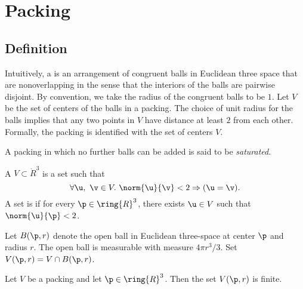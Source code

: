 
\chapter{Packing}


\section{Definition}



Intuitively, a  is an arrangement of congruent
balls in Euclidean three space that are nonoverlapping in the sense
that the interiors of the balls are pairwise disjoint.  By convention,
we take the radius of the congruent balls to be $1$.
Let $ V$ be the set of centers of the balls in a
packing. The choice of unit radius for the
balls implies that any two points in $ V$ have distance at
least $2$ from each other. 
 Formally, the packing is identified
with the set of centers $V$.
%

%
A packing in which no further balls can be added is said to be {\it
saturated}.

\begin{definition} 
A  $ V\subset \ring{R}^3$ is a set such that
\begin{displaymath}\forall  \u,~\v\in  V.~  \norm{ \u}{\v} < 2 \Rightarrow ( \u=\v).\end{displaymath} 
A set is  if for every $\p\in\ring{R}^3$, there
exists $ \u\in V$ such that $\norm{ \u}{\p}< 2$.
\end{definition}
%
%



Let $B(\p,r)$ denote the open ball in
Euclidean three-space at center $\p$ and radius $r$.  The open ball
is measurable with measure $4\pi r^3/3$.
 Set $ V(\p,r) = V \cap
B(\p,r)$. %
%
%

\begin{lemma}[] 
\label{lemma:V-finite}
Let $ V$ be a packing and let $\p\in\ring{R}^3$.
Then the set $ V(\p,r)$ is finite.
\end{lemma}

